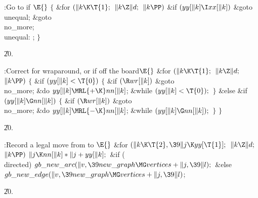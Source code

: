 \B{}:Go to  if \X${}\E{}$\6
${}\{{}$\1\6
\&{for} ${}(\|k\K\T{1};{}$ ${}\|k\Z\|d;{}$ ${}\|k\PP){}$\1\6
\&{if} ${}(\\{yy}[\|k]\I\\{xx}[\|k]){}$\1\5
\&{goto} \\{unequal};\2\2\6
\&{goto} \\{no\_more};\6
\4\\{unequal}:\5
;\6
\4${}\}{}$\2\par
\U20.\fi

\B{}:Correct for wraparound, or  if off the
board\X${}\E{}$\6
\&{for} ${}(\|k\K\T{1};{}$ ${}\|k\Z\|d;{}$ ${}\|k\PP){}$\5
${}\{{}$\1\6
\&{if} ${}(\\{yy}[\|k]<\T{0}){}$\5
${}\{{}$\1\6
\&{if} ${}(\R\\{wr}[\|k]){}$\1\5
\&{goto} \\{no\_more};\2\6
\&{do}\5
${}\\{yy}[\|k]\MRL{+{\K}}\\{nn}[\|k]{}$;\5
\5
\&{while} ${}(\\{yy}[\|k]<\T{0});{}$\6
\4${}\}{}$\5
\2\&{else} \&{if} ${}(\\{yy}[\|k]\G\\{nn}[\|k]){}$\5
${}\{{}$\1\6
\&{if} ${}(\R\\{wr}[\|k]){}$\1\5
\&{goto} \\{no\_more};\2\6
\&{do}\5
${}\\{yy}[\|k]\MRL{-{\K}}\\{nn}[\|k]{}$;\5
\5
\&{while} ${}(\\{yy}[\|k]\G\\{nn}[\|k]);{}$\6
\4${}\}{}$\2\6
\4${}\}{}$\2\par
\U20.\fi

\B{}:Record a legal move from  to \X${}\E{}$\6
\&{for} ${}(\|k\K\T{2},\39\|j\K\\{yy}[\T{1}];{}$ ${}\|k\Z\|d;{}$ ${}\|k\PP){}$%
\1\5
${}\|j\K\\{nn}[\|k]*\|j+\\{yy}[\|k];{}$\2\6
\&{if} (\\{directed})\1\5
${}\\{gb\_new\_arc}(\|v,\39\\{new\_graph}\MG\\{vertices}+\|j,\39\|l);{}$\2\6
\&{else}\1\5
${}\\{gb\_new\_edge}(\|v,\39\\{new\_graph}\MG\\{vertices}+\|j,\39\|l){}$;\2\par
\U20.\fi

